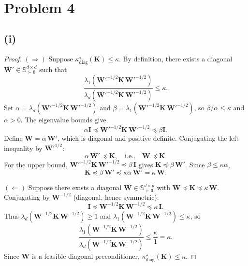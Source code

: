 \section*{Problem 4}

\subsection*{(i)}

\begin{proof}
$(\Rightarrow)$\; Suppose $\kappa^\star_{\mathrm{diag}}(\mathbf{K}) \le \kappa$. By definition, there exists a diagonal $\mathbf{W}' \in \mathbb{S}^{d \times d}_{\succ \mathbf{0}}$ such that
\[
\frac{\lambda_1\!\left(\mathbf{W}'^{-1/2}\mathbf{K}\,\mathbf{W}'^{-1/2}\right)}{\lambda_d\!\left(\mathbf{W}'^{-1/2}\mathbf{K}\,\mathbf{W}'^{-1/2}\right)} \le \kappa.
\]
Set $\alpha = \lambda_d\!\left(\mathbf{W}'^{-1/2}\mathbf{K}\,\mathbf{W}'^{-1/2}\right)$ and $\beta = \lambda_1\!\left(\mathbf{W}'^{-1/2}\mathbf{K}\,\mathbf{W}'^{-1/2}\right)$, so $\beta/\alpha \le \kappa$ and $\alpha > 0$. The eigenvalue bounds give
\[
\alpha \mathbf{I} \preceq \mathbf{W}'^{-1/2}\mathbf{K}\,\mathbf{W}'^{-1/2} \preceq \beta \mathbf{I}.
\]
Define $\mathbf{W} = \alpha\,\mathbf{W}'$, which is diagonal and positive definite. Conjugating the left inequality by $\mathbf{W}'^{1/2}$:
\[
\alpha\,\mathbf{W}' \preceq \mathbf{K}, \quad\text{i.e.,}\quad \mathbf{W} \preceq \mathbf{K}.
\]
For the upper bound, $\mathbf{W}'^{-1/2}\mathbf{K}\,\mathbf{W}'^{-1/2} \preceq \beta\,\mathbf{I}$ gives $\mathbf{K} \preceq \beta\,\mathbf{W}'$. Since $\beta \le \kappa\alpha$,
\[
\mathbf{K} \preceq \beta\,\mathbf{W}' \preceq \kappa\alpha\,\mathbf{W}' = \kappa\,\mathbf{W}.
\]

$(\Leftarrow)$\; Suppose there exists a diagonal $\mathbf{W} \in \mathbb{S}^{d \times d}_{\succ \mathbf{0}}$ with $\mathbf{W} \preceq \mathbf{K} \preceq \kappa\,\mathbf{W}$. Conjugating by $\mathbf{W}^{-1/2}$ (diagonal, hence symmetric):
\[
\mathbf{I} \preceq \mathbf{W}^{-1/2}\mathbf{K}\,\mathbf{W}^{-1/2} \preceq \kappa\,\mathbf{I}.
\]
Thus $\lambda_d\!\left(\mathbf{W}^{-1/2}\mathbf{K}\,\mathbf{W}^{-1/2}\right) \ge 1$ and $\lambda_1\!\left(\mathbf{W}^{-1/2}\mathbf{K}\,\mathbf{W}^{-1/2}\right) \le \kappa$, so
\[
\frac{\lambda_1\!\left(\mathbf{W}^{-1/2}\mathbf{K}\,\mathbf{W}^{-1/2}\right)}{\lambda_d\!\left(\mathbf{W}^{-1/2}\mathbf{K}\,\mathbf{W}^{-1/2}\right)} \le \frac{\kappa}{1} = \kappa.
\]
Since $\mathbf{W}$ is a feasible diagonal preconditioner, $\kappa^\star_{\mathrm{diag}}(\mathbf{K}) \le \kappa$.
\end{proof}

